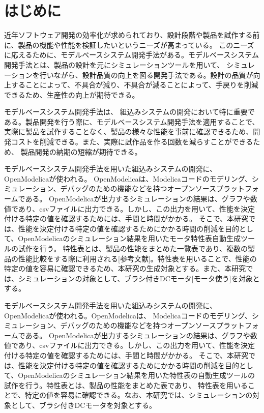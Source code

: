 \chapter{はじめに}\label{cha:Introduction}
近年ソフトウェア開発の効率化が求められており、設計段階や製品を試作する前に、製品の機能や性能を検証したいというニーズが高まっている\cite{modelicaモデルベース本}。
このニーズに応えるために、モデルベースシステム開発手法がある\cite{modelicaモデルベース本}。モデルベースシステム開発手法とは、製品の設計を元にシミュレーションツールを用いて、
シミュレーションを行いながら、設計品質の向上を図る開発手法である\cite{ipa_2016}。設計の品質が向上することによって、不具合が減り、不具合が減ることによって、手戻りを削減できるため、生産性の向上が期待できる\cite{ipa_2016}。

モデルベースシステム開発手法は、 組込みシステムの開発において特に重要である\cite{ipa_useful_modelbase_dev}。製品開発を行う際に、モデルベースシステム開発手法を適用することで、
実際に製品を試作することなく、製品の様々な性能を事前に確認できるため、開発コストを削減できる\cite{modelicaモデルベース本}。また、実際に試作品を作る回数を減らすことができるため、
製品開発の納期の短縮が期待できる。

モデルベースシステム開発手法を用いた組込みシステムの開発に、OpenModelica\cite{open_modelica}が使われる。
OpenModelicaは、Modelica\cite{modelicaモデルベース本}コードのモデリング、シミュレーション、デバッグのための機能などを持つオープンソースプラットフォームである。
OpenModelicaが出力するシミュレーションの結果は、グラフや数値であり、csvファイルに出力できる。しかし、この出力を用いて、性能を決定付ける特定の値を確認するためには、手間と時間がかかる。
そこで、本研究では、性能を決定付ける特定の値を確認するためにかかる時間の削減を目的として、OpenModelicaのシミュレーション結果を用いたモータ特性表自動生成ツールの試作を行う。
特性表とは、製品の性能をまとめた一覧表であり、複数の製品の性能比較をする際に利用される[参考文献]。特性表を用いることで、性能の特定の値を容易に確認できるため、本研究の生成対象とする。また、本研究では、シミュレーションの対象として、ブラシ付きDCモータ[モータ使う]を対象とする。


モデルベースシステム開発手法を用いた組込みシステムの開発に、OpenModelica\cite{open_modelica}が使われる。OpenModelicaは、
Modelica\cite{modelicaモデルベース本}コードのモデリング、シミュレーション、デバッグのための機能などを持つオープンソースプラットフォームである。
OpenModelicaが出力するシミュレーションの結果は、グラフや数値であり、csvファイルに出力できる。しかし、この出力を用いて、性能を決定付ける特定の値を確認するためには、手間と時間がかかる。
そこで、本研究では、性能を決定付ける特定の値を確認するためにかかる時間の削減を目的として、OpenModelicaのシミュレーション結果を用いた特性表の自動生成ツールの試作を行う。特性表とは、製品の性能をまとめた表であり、
特性表を用いることで、特定の値を容易に確認できる。なお、本研究では、シミュレーションの対象として、ブラシ付きDCモータ\cite{モータ使う}を対象とする。

